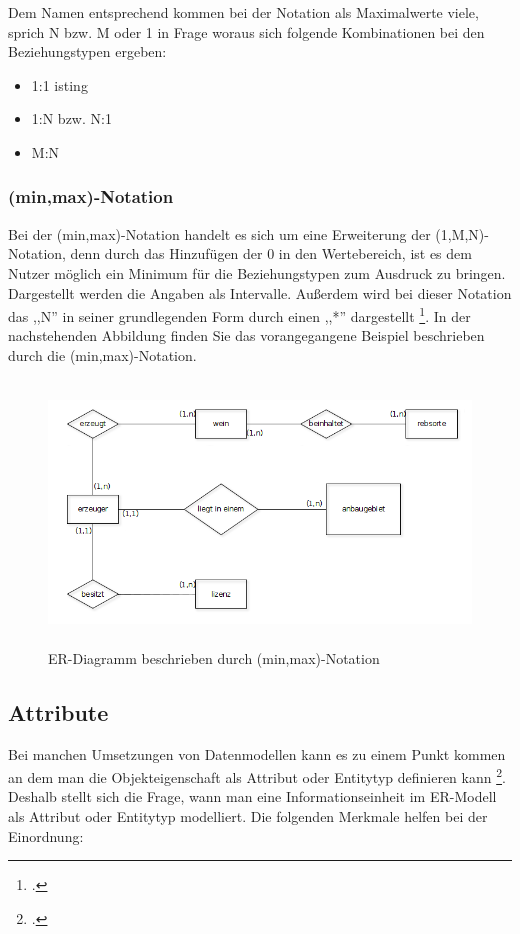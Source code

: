 \noindent
Dem Namen entsprechend kommen bei der Notation als Maximalwerte viele, sprich N bzw. M oder 1 in Frage woraus sich folgende Kombinationen bei den Beziehungstypen ergeben:
\\
\begin{itemize}
	\item 1:1
isting	\item 1:N bzw. N:1
	\item M:N
	\\	
\end{itemize}

\subsubsection{(min,max)-Notation}
\noindent
Bei der (min,max)-Notation handelt es sich um eine Erweiterung der (1,M,N)-Notation, denn durch das Hinzufügen der 0 in den Wertebereich, ist es dem Nutzer möglich ein Minimum für die Beziehungstypen zum Ausdruck zu bringen.
\\

\noindent
Dargestellt werden die Angaben als Intervalle. Außerdem wird bei dieser Notation das ,,N'' in seiner grundlegenden Form durch einen ,,*'' dargestellt \footcite{taschenbuch}. In der nachstehenden Abbildung finden Sie das vorangegangene Beispiel beschrieben durch die (min,max)-Notation.

\begin{figure}[!h]
	\begin{center}
		\includegraphics[width=14cm, height=7cm]{images/m_n_notation_bsp.png}
		\caption{ER-Diagramm beschrieben durch (min,max)-Notation}
		\label{MinMaxNotation}
	\end{center}
\end{figure}

\subsection{Attribute}
\prc
Bei manchen Umsetzungen von Datenmodellen kann es zu einem Punkt kommen an dem man die Objekteigenschaft als Attribut oder Entitytyp definieren kann \footcite{skriptum}. Deshalb stellt sich die Frage, wann man eine Informationseinheit im ER-Modell als Attribut oder Entitytyp modelliert. Die folgenden Merkmale helfen bei der Einordnung:
\\

